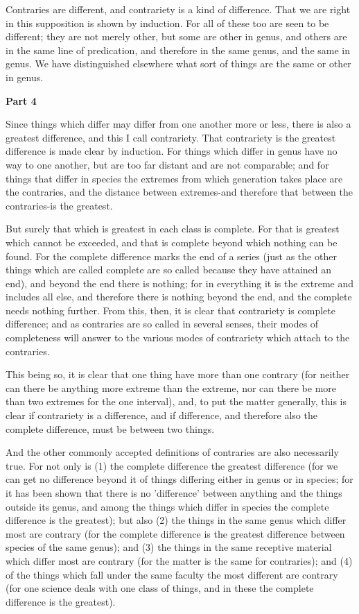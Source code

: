 Contraries are different, and contrariety is a kind of difference. That we are right in this supposition is shown by induction. For all of these too are seen to be different; they are not merely other, but some are other in genus, and others are in the same line of predication, and therefore in the same genus, and the same in genus. We have distinguished elsewhere what sort of things are the same or other in genus.

\textbf{Part 4}

Since things which differ may differ from one another more or less, there is also a greatest difference, and this I call contrariety. That contrariety is the greatest difference is made clear by induction. For things which differ in genus have no way to one another, but are too far distant and are not comparable; and for things that differ in species the extremes from which generation takes place are the contraries, and the distance between extremes-and therefore that between the contraries-is the greatest.

But surely that which is greatest in each class is complete. For that is greatest which cannot be exceeded, and that is complete beyond which nothing can be found. For the complete difference marks the end of a series (just as the other things which are called complete are so called because they have attained an end), and beyond the end there is nothing; for in everything it is the extreme and includes all else, and therefore there is nothing beyond the end, and the complete needs nothing further. From this, then, it is clear that contrariety is complete difference; and as contraries are so called in several senses, their modes of completeness will answer to the various modes of contrariety which attach to the contraries.

This being so, it is clear that one thing have more than one contrary (for neither can there be anything more extreme than the extreme, nor can there be more than two extremes for the one interval), and, to put the matter generally, this is clear if contrariety is a difference, and if difference, and therefore also the complete difference, must be between two things.

And the other commonly accepted definitions of contraries are also necessarily true. For not only is (1) the complete difference the greatest difference (for we can get no difference beyond it of things differing either in genus or in species; for it has been shown that there is no 'difference' between anything and the things outside its genus, and among the things which differ in species the complete difference is the greatest); but also (2) the things in the same genus which differ most are contrary (for the complete difference is the greatest difference between species of the same genus); and (3) the things in the same receptive material which differ most are contrary (for the matter is the same for contraries); and (4) of the things which fall under the same faculty the most different are contrary (for one science deals with one class of things, and in these the complete difference is the greatest).

